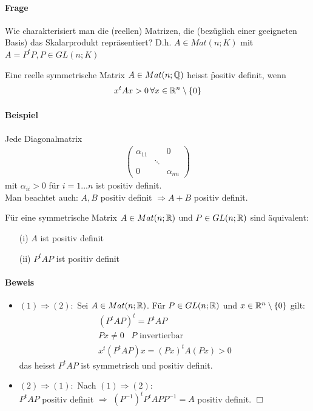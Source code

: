 \paragraph{Frage}
Wie charakterisiert man die (reellen) Matrizen, die (bezüglich einer geeigneten Basis) das Skalarprodukt repräsentiert? D.h. $A \in Mat(n; K)$ mit $A = P^t P, P \in GL(n;K)$

Eine reelle symmetrische Matrix $A \in Mat(n; \mathbb{Q})$ heisst \f{positiv definit}, wenn
\begin{align}
 x^t A x > 0 \,\forall x \in \mathbb{R}^n\setminus\{0\}
\end{align}

\paragraph{Beispiel}
Jede Diagonalmatrix
\begin{align}
\begin{pmatrix} \alpha_{11} & & 0 \\ & \ddots & \\ 0 & & \alpha_{nn} \end{pmatrix}
\end{align}
mit $\alpha_{ii} > 0$ für $i = 1...n$ ist positiv definit. \\
Man beachtet auch: $A, B$ positiv definit $\Rightarrow A + B$ positiv definit. 

\begin{lemma} %
\label{lemma512}
Für eine symmetrische Matrix $A \in Mat(n; \mathbb{R})$ und $P \in GL(n; \mathbb{R})$ sind äquivalent:
\begin{itemize}
\item[(i)] $A$ ist positiv definit
\item[(ii)] $P^t AP$ ist positiv definit
\end{itemize}
\end{lemma}

\paragraph{Beweis}
\begin{itemize}
\item $(1) \Rightarrow (2):$ Sei $A \in Mat(n; \mathbb{R})$. Für $P \in GL(n; \mathbb{R})$ und $x \in \mathbb{R}^n\setminus\{0\}$ gilt:
\begin{align}
(P^t AP)^t = P^t AP \\
Px \neq 0\, \text{ $P$ invertierbar} \\
x^t (P^t AP) x = (Px)^t A (Px) > 0 
\end{align}
das heisst $P^t AP$ ist symmetrisch und positiv definit.

\item $(2) \Rightarrow (1):$ Nach $(1) \Rightarrow (2)$: \\
$P^t A P$ positiv definit $\Rightarrow$ $(P^{-1})^t P^t A PP^{-1} = A$ positiv definit. \hfill $\Box$
\end{itemize}

